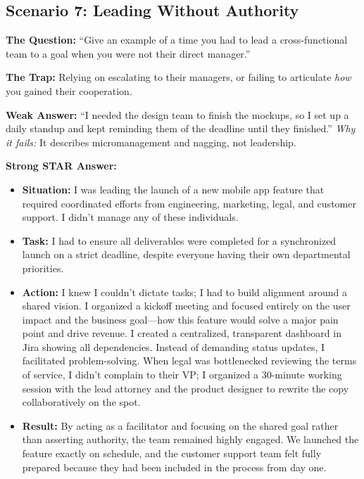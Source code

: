 \subsection{Scenario 7: Leading Without
Authority}\label{scenario-7-leading-without-authority}

\textbf{The Question:} ``Give an example of a time you had to lead a
cross-functional team to a goal when you were not their direct
manager.''

\textbf{The Trap:} Relying on escalating to their managers, or failing
to articulate \emph{how} you gained their cooperation.

\textbf{Weak Answer:} ``I needed the design team to finish the mockups,
so I set up a daily standup and kept reminding them of the deadline
until they finished.'' \emph{Why it fails:} It describes micromanagement
and nagging, not leadership.

\textbf{Strong STAR Answer:}

\begin{itemize}
\tightlist
\item
  \textbf{Situation:} I was leading the launch of a new mobile app
  feature that required coordinated efforts from engineering, marketing,
  legal, and customer support. I didn't manage any of these individuals.
\item
  \textbf{Task:} I had to ensure all deliverables were completed for a
  synchronized launch on a strict deadline, despite everyone having
  their own departmental priorities.
\item
  \textbf{Action:} I knew I couldn't dictate tasks; I had to build
  alignment around a shared vision. I organized a kickoff meeting and
  focused entirely on the user impact and the business goal---how this
  feature would solve a major pain point and drive revenue. I created a
  centralized, transparent dashboard in Jira showing all dependencies.
  Instead of demanding status updates, I facilitated problem-solving.
  When legal was bottlenecked reviewing the terms of service, I didn't
  complain to their VP; I organized a 30-minute working session with the
  lead attorney and the product designer to rewrite the copy
  collaboratively on the spot.
\item
  \textbf{Result:} By acting as a facilitator and focusing on the shared
  goal rather than asserting authority, the team remained highly
  engaged. We launched the feature exactly on schedule, and the customer
  support team felt fully prepared because they had been included in the
  process from day one.
\end{itemize}


